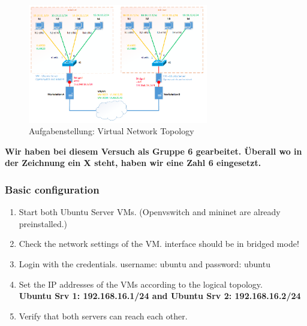 \documentclass[a4,12pt]{scrartcl}
\begin{document}
\begin{figure} [H]
	\begin{center}
	\includegraphics[width=0.70\textwidth]{./pictures/vxlan_config.png}
	\caption{Aufgabenstellung: Virtual Network Topology}
	\label{x}
	\end{center}
\end{figure}
\noindent \textbf{Wir haben bei diesem Versuch als Gruppe 6 gearbeitet. Überall wo in der Zeichnung ein X steht, haben wir eine Zahl 6 eingesetzt.}

\subsubsection{Basic configuration}
\begin{enumerate}
\item Start both Ubuntu Server VMs. (Openvswitch and mininet are already preinstalled.)
\item Check the network settings of the VM. interface should be in bridged mode!
\item Login with the credentials. username: ubuntu and password: ubuntu
\item Set the IP addresses of the VMs according to the logical topology.\\
\textbf{Ubuntu Srv 1: 192.168.16.1/24 and Ubuntu Srv 2: 192.168.16.2/24}
\item Verify that both servers can reach each other.
\end{enumerate}
\end{document}
